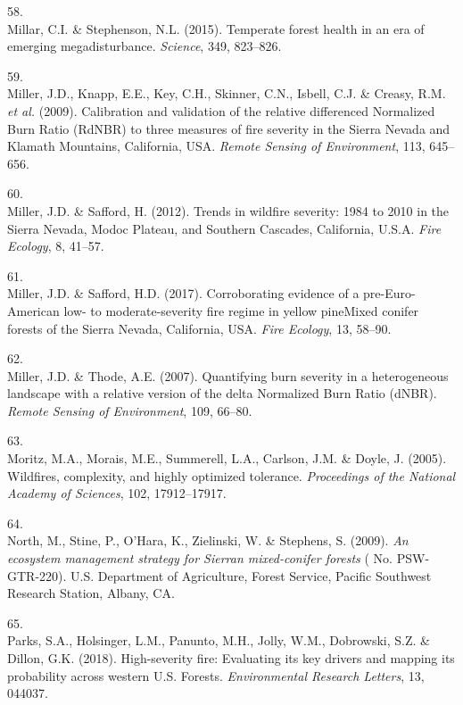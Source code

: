 \documentclass[]{article}
\begin{document}
\leavevmode\hypertarget{ref-millar2015}{}%
58.\\
Millar, C.I. \& Stephenson, N.L. (2015). Temperate forest health in an
era of emerging megadisturbance. \emph{Science}, 349, 823--826.

\leavevmode\hypertarget{ref-miller2009a}{}%
59.\\
Miller, J.D., Knapp, E.E., Key, C.H., Skinner, C.N., Isbell, C.J. \&
Creasy, R.M. \emph{et al.} (2009). Calibration and validation of the
relative differenced Normalized Burn Ratio (RdNBR) to three measures of
fire severity in the Sierra Nevada and Klamath Mountains, California,
USA. \emph{Remote Sensing of Environment}, 113, 645--656.

\leavevmode\hypertarget{ref-miller2012a}{}%
60.\\
Miller, J.D. \& Safford, H. (2012). Trends in wildfire severity: 1984 to
2010 in the Sierra Nevada, Modoc Plateau, and Southern Cascades,
California, U.S.A. \emph{Fire Ecology}, 8, 41--57.

\leavevmode\hypertarget{ref-miller2017}{}%
61.\\
Miller, J.D. \& Safford, H.D. (2017). Corroborating evidence of a
pre-Euro-American low- to moderate-severity fire regime in yellow
pineMixed conifer forests of the Sierra Nevada, California, USA.
\emph{Fire Ecology}, 13, 58--90.

\leavevmode\hypertarget{ref-miller2007}{}%
62.\\
Miller, J.D. \& Thode, A.E. (2007). Quantifying burn severity in a
heterogeneous landscape with a relative version of the delta Normalized
Burn Ratio (dNBR). \emph{Remote Sensing of Environment}, 109, 66--80.

\leavevmode\hypertarget{ref-moritz2005}{}%
63.\\
Moritz, M.A., Morais, M.E., Summerell, L.A., Carlson, J.M. \& Doyle, J.
(2005). Wildfires, complexity, and highly optimized tolerance.
\emph{Proceedings of the National Academy of Sciences}, 102,
17912--17917.

\leavevmode\hypertarget{ref-north2009a}{}%
64.\\
North, M., Stine, P., O'Hara, K., Zielinski, W. \& Stephens, S. (2009).
\emph{An ecosystem management strategy for Sierran mixed-conifer
forests} ( No. PSW-GTR-220). U.S. Department of Agriculture, Forest
Service, Pacific Southwest Research Station, Albany, CA.

\leavevmode\hypertarget{ref-parks2018}{}%
65.\\
Parks, S.A., Holsinger, L.M., Panunto, M.H., Jolly, W.M., Dobrowski,
S.Z. \& Dillon, G.K. (2018). High-severity fire: Evaluating its key
drivers and mapping its probability across western U.S. Forests.
\emph{Environmental Research Letters}, 13, 044037.
\end{document}
